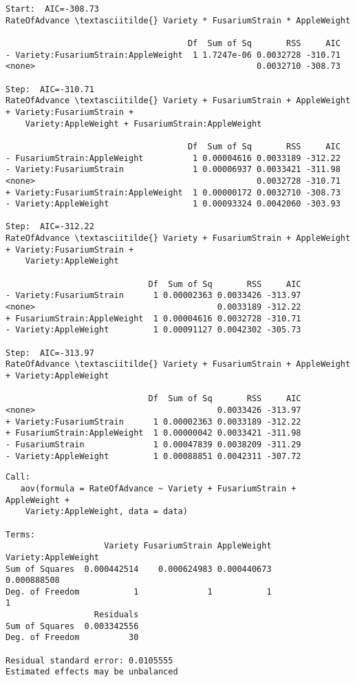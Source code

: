 \documentclass[11pt]{article}
\begin{document}
    \begin{Verbatim}[commandchars=\\\{\}]
Start:  AIC=-308.73
RateOfAdvance \textasciitilde{} Variety * FusariumStrain * AppleWeight

                                     Df  Sum of Sq       RSS     AIC
- Variety:FusariumStrain:AppleWeight  1 1.7247e-06 0.0032728 -310.71
<none>                                             0.0032710 -308.73

Step:  AIC=-310.71
RateOfAdvance \textasciitilde{} Variety + FusariumStrain + AppleWeight + Variety:FusariumStrain + 
    Variety:AppleWeight + FusariumStrain:AppleWeight

                                     Df  Sum of Sq       RSS     AIC
- FusariumStrain:AppleWeight          1 0.00004616 0.0033189 -312.22
- Variety:FusariumStrain              1 0.00006937 0.0033421 -311.98
<none>                                             0.0032728 -310.71
+ Variety:FusariumStrain:AppleWeight  1 0.00000172 0.0032710 -308.73
- Variety:AppleWeight                 1 0.00093324 0.0042060 -303.93

Step:  AIC=-312.22
RateOfAdvance \textasciitilde{} Variety + FusariumStrain + AppleWeight + Variety:FusariumStrain + 
    Variety:AppleWeight

                             Df  Sum of Sq       RSS     AIC
- Variety:FusariumStrain      1 0.00002363 0.0033426 -313.97
<none>                                     0.0033189 -312.22
+ FusariumStrain:AppleWeight  1 0.00004616 0.0032728 -310.71
- Variety:AppleWeight         1 0.00091127 0.0042302 -305.73

Step:  AIC=-313.97
RateOfAdvance \textasciitilde{} Variety + FusariumStrain + AppleWeight + Variety:AppleWeight

                             Df  Sum of Sq       RSS     AIC
<none>                                     0.0033426 -313.97
+ Variety:FusariumStrain      1 0.00002363 0.0033189 -312.22
+ FusariumStrain:AppleWeight  1 0.00000042 0.0033421 -311.98
- FusariumStrain              1 0.00047839 0.0038209 -311.29
- Variety:AppleWeight         1 0.00088851 0.0042311 -307.72

    \end{Verbatim}

    
    \begin{verbatim}
Call:
   aov(formula = RateOfAdvance ~ Variety + FusariumStrain + AppleWeight + 
    Variety:AppleWeight, data = data)

Terms:
                    Variety FusariumStrain AppleWeight Variety:AppleWeight
Sum of Squares  0.000442514    0.000624983 0.000440673         0.000888508
Deg. of Freedom           1              1           1                   1
                  Residuals
Sum of Squares  0.003342556
Deg. of Freedom          30

Residual standard error: 0.0105555
Estimated effects may be unbalanced
    \end{verbatim}
\end{document}

